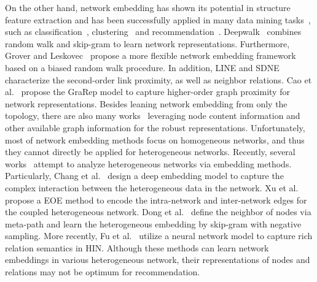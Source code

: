 On the other hand, network embedding has shown its potential in structure feature extraction and has been successfully applied in many data mining tasks~\cite{hoff2002latent,yan2007graph,cui2017survey,cui2018general}, such as classification~\cite{tu2016max}, clustering~\cite{wei2017cross,cao2016deep} and recommendation~\cite{liang2016factorization,sunmrlr}. Deepwalk~\cite{perozzi2014deepwalk} combines random walk and skip-gram to learn network representations. Furthermore, Grover and Leskovec~\cite{grover2016node2vec} propose a more flexible network embedding framework based on a biased random walk procedure. In addition, LINE \cite{tang2015line} and SDNE~\cite{wang2016structural} characterize the second-order link proximity, as well as neighbor relations. Cao et al.~\cite{cao2015grarep} propose the GraRep model to capture higher-order graph proximity for network representations. Besides leaning network embedding from only the topology,  there are also many works~\cite{pan2016tri,yang2015network,zhang2016homophily} leveraging node content information and other available graph information for the robust representations. Unfortunately, most of network embedding methods focus on homogeneous networks, and thus they cannot directly be applied for heterogeneous networks. Recently, several works~\cite{chang2015heterogeneous,tang2015pte,xu2017embedding,chen2017task,dong2017metapath2vec} attempt to analyze heterogeneous networks via embedding methods. Particularly, Chang et al.~\cite{chang2015heterogeneous} design a deep embedding model to capture the complex interaction between the heterogeneous data in the network. Xu et al.~\cite{xu2017embedding} propose a EOE method to encode the intra-network and inter-network edges for the coupled heterogeneous network. Dong et al.~\cite{dong2017metapath2vec} define the neighbor of nodes via meta-path and learn the heterogeneous embedding by skip-gram with negative sampling. More recently, Fu et al.~\cite{fu2017hin2vec} utilize a neural network model to capture rich relation semantics in HIN. Although these methods can learn network embeddings in various heterogeneous network, their representations of nodes and relations may not be optimum for recommendation.



